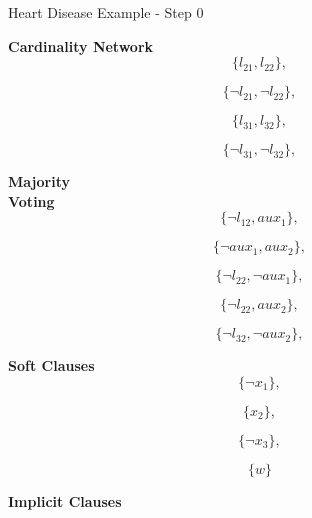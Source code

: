 \begin{frame}{Heart Disease Example - Step 0}
\begin{minipage}[t]{0.19\textwidth}
\begin{block}{\centering \fontsize{8.5pt}{2pt}\selectfont \textbf{Cardinality Network}}
            \[\{l_{21} , l_{22}\},\]
            
            \[\{\lnot l_{21} , \lnot l_{22}\},\]
            
            \[\{l_{31} , l_{32}\},\]
            
            \[\{\lnot l_{31} , \lnot l_{32}\},\]
            \vspace{2pt}
        \end{block}
    \end{minipage}
    \hspace{0.05\textwidth}
    \begin{minipage}[t]{0.18\textwidth}
        \begin{block}{\centering \fontsize{8.5pt}{2pt}\selectfont \textbf{Majority \\ Voting}}
            \linespread{0.1}
            \[\{\lnot l_{12} , aux_{1}\},\]
            \linespread{0.3}
            
            \[\{\lnot aux_{1}, aux_{2}\},\]
            
            \[\{\lnot l_{22} , \lnot aux_{1}\},\]
            
            \[\{\lnot l_{22} , aux_{2}\},\]
            
            \[\{\lnot l_{32} , \lnot aux_{2}\},\]
            \vspace{2pt}
        \end{block}
    \end{minipage}
    \hspace{0.05\textwidth}
    \begin{minipage}[t]{0.12\textwidth}
        \begin{block}{\centering \fontsize{8.5pt}{2pt}\selectfont \textbf{Soft Clauses}}
            \linespread{0.3}
            \[\{\lnot x_{1}\},\]
            
            \[\{x_{2}\},\]
            
            \[\{\lnot x_{3}\},\]
            
            \[\{w\}\]
        \end{block}
        \vspace{10pt}
        \begin{block}{\centering \fontsize{8.5pt}{1pt}\selectfont \textbf{Implicit Clauses}}
            \vspace{5pt}
        \end{block}
    \end{minipage}
\end{frame}


